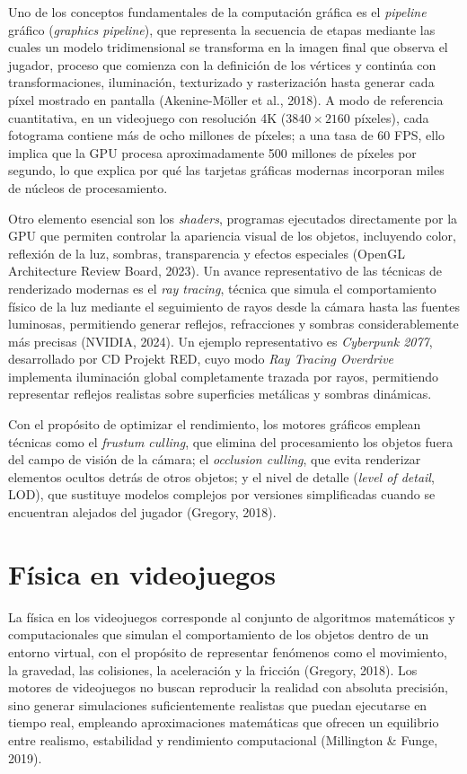 \documentclass[12pt]{report}
\begin{document}
Uno de los conceptos fundamentales de la computación gráfica es el \textit{pipeline} gráfico (\textit{graphics pipeline}), que representa la secuencia de etapas mediante las cuales un modelo tridimensional se transforma en la imagen final que observa el jugador, proceso que comienza con la definición de los vértices y continúa con transformaciones, iluminación, texturizado y rasterización hasta generar cada píxel mostrado en pantalla (Akenine-Möller et al., 2018). A modo de referencia cuantitativa, en un videojuego con resolución 4K ($3840 \times 2160$ píxeles), cada fotograma contiene más de ocho millones de píxeles; a una tasa de 60 FPS, ello implica que la GPU procesa aproximadamente 500 millones de píxeles por segundo, lo que explica por qué las tarjetas gráficas modernas incorporan miles de núcleos de procesamiento.

Otro elemento esencial son los \textit{shaders}, programas ejecutados directamente por la GPU que permiten controlar la apariencia visual de los objetos, incluyendo color, reflexión de la luz, sombras, transparencia y efectos especiales (OpenGL Architecture Review Board, 2023). Un avance representativo de las técnicas de renderizado modernas es el \textit{ray tracing}, técnica que simula el comportamiento físico de la luz mediante el seguimiento de rayos desde la cámara hasta las fuentes luminosas, permitiendo generar reflejos, refracciones y sombras considerablemente más precisas (NVIDIA, 2024). Un ejemplo representativo es \textit{Cyberpunk 2077}, desarrollado por CD Projekt RED, cuyo modo \textit{Ray Tracing Overdrive} implementa iluminación global completamente trazada por rayos, permitiendo representar reflejos realistas sobre superficies metálicas y sombras dinámicas.

Con el propósito de optimizar el rendimiento, los motores gráficos emplean técnicas como el \textit{frustum culling}, que elimina del procesamiento los objetos fuera del campo de visión de la cámara; el \textit{occlusion culling}, que evita renderizar elementos ocultos detrás de otros objetos; y el nivel de detalle (\textit{level of detail}, LOD), que sustituye modelos complejos por versiones simplificadas cuando se encuentran alejados del jugador (Gregory, 2018).

\section{Física en videojuegos}

La física en los videojuegos corresponde al conjunto de algoritmos matemáticos y computacionales que simulan el comportamiento de los objetos dentro de un entorno virtual, con el propósito de representar fenómenos como el movimiento, la gravedad, las colisiones, la aceleración y la fricción (Gregory, 2018). Los motores de videojuegos no buscan reproducir la realidad con absoluta precisión, sino generar simulaciones suficientemente realistas que puedan ejecutarse en tiempo real, empleando aproximaciones matemáticas que ofrecen un equilibrio entre realismo, estabilidad y rendimiento computacional (Millington \& Funge, 2019).
\end{document}
